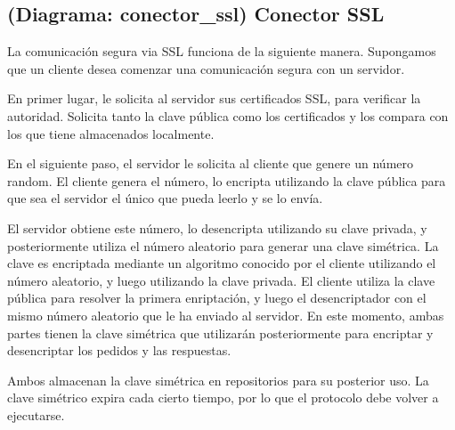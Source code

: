 \subsection{(Diagrama: conector_ssl) Conector SSL}

La comunicación segura via SSL funciona de la siguiente manera. Supongamos que un cliente desea comenzar una comunicación segura con un servidor.

En primer lugar, le solicita al servidor sus certificados SSL, para verificar la autoridad. Solicita tanto la clave pública como los certificados y los compara con los que tiene almacenados localmente.

En el siguiente paso, el servidor le solicita al cliente que genere un número random. El cliente genera el número, lo encripta utilizando la clave pública para que sea el servidor el único que pueda leerlo y se lo envía.

El servidor obtiene este número, lo desencripta utilizando su clave privada, y posteriormente utiliza el número aleatorio para generar una clave simétrica. La clave es encriptada mediante un algoritmo conocido por el cliente utilizando el número aleatorio, y luego utilizando la clave privada. El cliente utiliza la clave pública para resolver la primera enriptación, y luego el desencriptador con el mismo número aleatorio que le ha enviado al servidor. En este momento, ambas partes tienen la clave simétrica que utilizarán posteriormente para encriptar y desencriptar los pedidos y las respuestas.

Ambos almacenan la clave simétrica en repositorios para su posterior uso. La clave simétrico expira cada cierto tiempo, por lo que el protocolo debe volver a ejecutarse.
